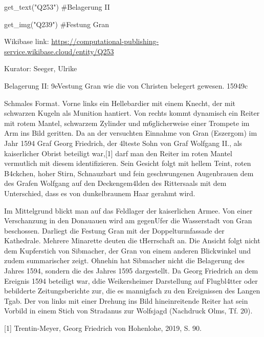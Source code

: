 \documentclass[
  a4paper,
  portrait]{book}
\newenvironment{Shaded}{\begin{snugshade}}{\end{snugshade}}
\newcommand{\CommentTok}[1]{\textcolor[rgb]{0.37,0.37,0.37}{#1}}
\newcommand{\NormalTok}[1]{\textcolor[rgb]{0.00,0.23,0.31}{#1}}
\newcommand{\StringTok}[1]{\textcolor[rgb]{0.13,0.47,0.30}{#1}}
\begin{document}
\begin{Shaded}
\begin{Highlighting}[]
\NormalTok{get\_text(}\StringTok{"Q253"}\NormalTok{)}
\CommentTok{\#Belagerung II}

\NormalTok{get\_img(}\StringTok{"Q239"}\NormalTok{)}
\CommentTok{\#Festung Gran}
\end{Highlighting}
\end{Shaded}

Wikibase link:
\url{https://computational-publishing-service.wikibase.cloud/entity/Q253}

Kurator: Seeger, Ulrike

Belagerung II: \x9eVestung Gran wie die von Christen belegert
gewesen. 1594\x9c

Schmales Format. Vorne links ein Hellebardier mit einem Knecht, der mit
schwarzen Kugeln als Munition hantiert. Von rechts kommt dynamisch ein
Reiter mit rotem Mantel, schwarzem Zylinder und m\xb6glicherweise
einer Trompete im Arm ins Bild geritten. Da an der versuchten Einnahme
von Gran (Eszergom) im Jahr 1594 Graf Georg Friedrich, der
\xa4lteste Sohn von Graf Wolfgang II., als kaiserlicher Obrist
beteiligt war,{[}1{]} darf man den Reiter im roten Mantel vermutlich mit
diesem identifizieren. Sein Gesicht folgt mit hellem Teint, roten
B\xa4ckchen, hoher Stirn, Schnauzbart und fein geschwungenen
Augenbrauen dem des Grafen Wolfgang auf den Deckengem\xa4lden des
Rittersaals mit dem Unterschied, dass es von dunkelbraunem Haar gerahmt
wird.

Im Mittelgrund blickt man auf das Feldlager der kaiserlichen Armee. Von
einer Verschanzung in den Donauauen wird am
gegen\xbcberliegenden Ufer die Wasserstadt von Gran beschossen.
Dar\xbcber liegt die Festung Gran mit der Doppelturmfassade der
Kathedrale. Mehrere Minarette deuten die t\xbcrkische Herrschaft an.
Die Ansicht folgt nicht dem Kupferstich von Sibmacher, der Gran von
einem anderen Blickwinkel und zudem summarischer zeigt. Ohnehin hat
Sibmacher nicht die Belagerung des Jahres 1594, sondern die des Jahres
1595 dargestellt. Da Georg Friedrich an dem Ereignis 1594 beteiligt war,
d\xbcrfte die Weikersheimer Darstellung auf Flugbl\xa4tter oder
bebilderte Zeitungsberichte zur\xbcckgehen, die es mannigfach zu den
Ereignissen des Langen T\xbcrkenkriegs gab. Der von links mit einer
Drehung ins Bild hineinreitende Reiter hat sein Vorbild in einem Stich
von Stradanus zur Wolfsjagd (Nachdruck Olms, Tf. 20).

{[}1{]} Trentin-Meyer, Georg Friedrich von Hohenlohe, 2019, S. 90.
\end{document}
